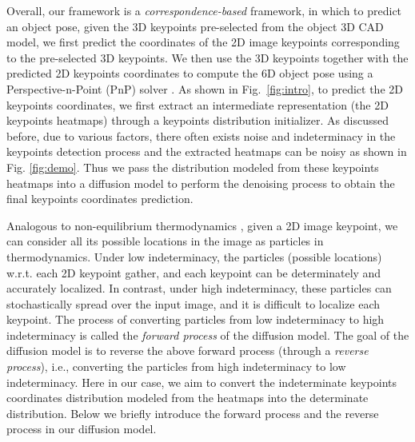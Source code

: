 \documentclass[10pt,twocolumn,letterpaper]{article}
\begin{document}
Overall, our framework is a \textit{correspondence-based} framework, in which to predict an object pose, given the 3D keypoints pre-selected from the object 3D CAD model, we first predict the coordinates of the 2D image keypoints corresponding to the pre-selected 3D keypoints. 
We then use the 3D keypoints together with the predicted 2D keypoints coordinates to compute the 6D object pose using a Perspective-n-Point (PnP) solver \cite{gao2003complete,lepetit2009ep}. 
As shown in Fig.~\ref{fig:intro}, to predict the 2D keypoints coordinates, we first extract an intermediate representation (the 2D keypoints heatmaps) through a keypoints distribution initializer. 
As discussed before, due to various factors, there often exists noise and indeterminacy in the keypoints detection process and the extracted heatmaps can be noisy as shown in Fig. \ref{fig:demo}.
Thus we pass the distribution modeled from these keypoints heatmaps into a diffusion model to perform the denoising process to obtain the final keypoints coordinates prediction.


Analogous to non-equilibrium thermodynamics \cite{sohl2015deep}, 
given a 2D image keypoint, we can consider all its possible locations in the image as particles in thermodynamics. 
Under low indeterminacy, the particles (possible locations) w.r.t. each 2D keypoint gather, and each keypoint can be determinately and accurately localized.
In contrast, under high indeterminacy, these particles can stochastically spread over the input image, and it is difficult to localize each keypoint. 
The process of converting particles from low indeterminacy to high indeterminacy is called the \textit{forward process} of the diffusion model. 
The goal of the diffusion model is to reverse the above forward process (through a \textit{reverse process}), i.e., converting the particles from high indeterminacy to low indeterminacy.
Here in our case, we aim to convert the indeterminate keypoints coordinates distribution modeled from the heatmaps into the determinate distribution. 
Below we briefly introduce the forward process and the reverse process in our diffusion model.
\end{document}
